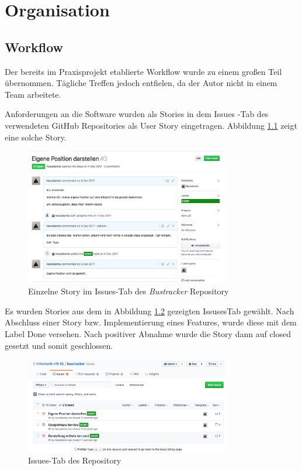 \chapter{Organisation}
\label{Organisation}
\section{Workflow}
Der bereits im Praxisprojekt \cite{PraxBerJoSc} etablierte Workflow wurde zu einem großen Teil übernommen. 
Tägliche Treffen jedoch entfielen, da der Autor nicht in einem Team arbeitete.

Anforderungen an die Software wurden als Stories in dem \glqq Issues \grqq-Tab des verwendeten GitHub Repositories als User Story eingetragen. Abbildung  \ref{fig:EinzelStory} zeigt eine solche Story.


\begin{figure}[htbp] 
  \centering
     \includegraphics[width=0.8\textwidth]{images/EinzelStory.png} 
  \caption{Einzelne Story im Issues-Tab des \emph{Bustracker} Repository}
  \label{fig:EinzelStory}
\end{figure}

Es wurden Stories aus dem in Abbildung \ref{fig:IssuesTab} gezeigten IssusesTab gewählt. Nach Abschluss einer Story bzw. Implementierung eines Features, wurde diese mit dem Label \glqq Done\grqq{} versehen. Nach positiver Abnahme wurde die Story dann auf \glqq closed\grqq{} gesetzt und somit geschlossen.

\begin{figure}[htbp] 
  \centering
     \includegraphics[width=0.8\textwidth]{images/issues_tab.png} 
  \caption{Issues-Tab des Repository}
  \label{fig:IssuesTab}
\end{figure}

